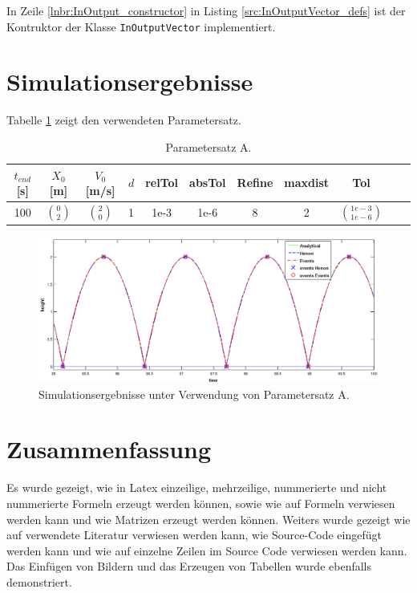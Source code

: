 \documentclass[a4paper,11pt]{scrartcl}
\begin{document}
In Zeile \ref{lnbr:InOutput_constructor} in Listing \ref{src:InOutputVector_defs} ist der Kontruktor der Klasse
\verb|InOutputVector| implementiert.

\section{Simulationsergebnisse}

Tabelle \ref{tab:ParA} zeigt den verwendeten Parametersatz.
\begin{table}[!h]
{\small%
\newcommand{\mc}[3]{\multicolumn{#1}{#2}{#3}}
\begin{center}
\begin{tabular}{|c|c|c|c|c|c|c|c|c|c|c|}
 \hline
 $t_{end}$ [s] & $X_0$ [m]    & $V_0$ [m/s]  & $d$ & relTol & absTol & Refine & maxdist & Tol\\
 \hline
      100      & $\binom{0}{2}$ & $\binom{2}{0}$ &  1  & 1e-3   &  1e-6  &    8   &     2   &  $\binom{1e-3}{1e-6}$ \\
 \hline
\end{tabular}
\end{center}
}%
\caption{Parametersatz A.}
\label{tab:ParA}
\end{table}

\begin{figure}[!ht]
 \centering
 \includegraphics[width=\textwidth]{./Bilder/bBheightode23last5Sec.png}
 \caption{Simulationsergebnisse unter Verwendung von Parametersatz A.}
 \label{fig:Bild2}
\end{figure}

\section{Zusammenfassung}
Es wurde gezeigt, wie in Latex einzeilige, mehrzeilige, nummerierte und nicht nummerierte
Formeln erzeugt werden können, sowie wie auf Formeln verwiesen werden kann und wie Matrizen
erzeugt werden können. Weiters wurde gezeigt wie auf verwendete Literatur verwiesen werden kann,
wie Source-Code eingefügt werden kann und wie auf einzelne Zeilen im Source Code verwiesen werden kann.
Das Einfügen von Bildern und das Erzeugen von Tabellen wurde ebenfalls demonstriert.
\end{document}
